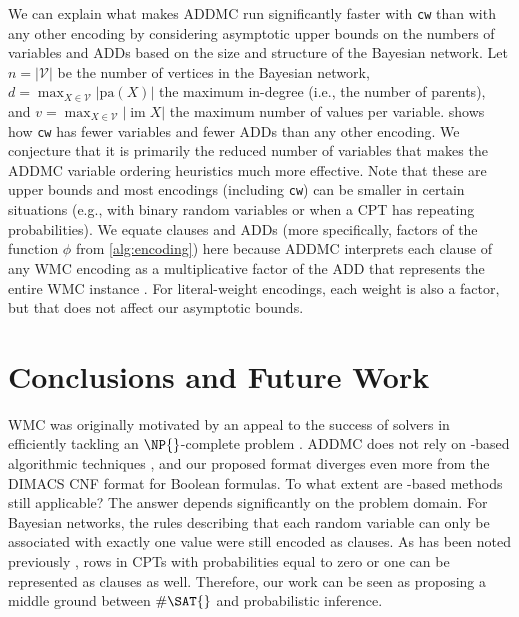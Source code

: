 \documentclass[accepted]{uai2021}
\theoremstyle{definition}
\DeclareMathOperator{\im}{im}
\begin{document}
We can explain what makes \textsf{ADDMC} \citep{DBLP:conf/aaai/DudekPV20} run
significantly faster with \texttt{cw} than with any other encoding by
considering asymptotic upper bounds on the numbers of variables and ADDs based
on the size and structure of the Bayesian network. Let $n = |\mathcal{V}|$ be
the number of vertices in the Bayesian network, $d = \max_{X \in \mathcal{V}}
|\mathrm{pa}(X)|$ the maximum in-degree (i.e., the number of parents), and $v =
\max_{X \in \mathcal{V}} |\im X|$ the maximum number of values per variable.
 shows how \texttt{cw} has fewer variables and fewer ADDs
than any other encoding. We conjecture that it is primarily the reduced number
of variables that makes the \textsf{ADDMC} variable ordering heuristics much
more effective. Note that these are upper bounds and most encodings (including
\texttt{cw}) can be smaller in certain situations (e.g., with binary random
variables or when a CPT has repeating probabilities). We equate clauses and ADDs
(more specifically, factors of the function $\phi$ from \cref{alg:encoding})
here because \textsf{ADDMC} interprets each clause of any WMC encoding as a
multiplicative factor of the ADD that represents the entire WMC instance
\citep{DBLP:conf/aaai/DudekPV20}. For literal-weight encodings, each weight is
also a factor, but that does not affect our asymptotic bounds.

\section{Conclusions and Future Work}

WMC was originally motivated by an appeal to the success of \SAT{} solvers in
efficiently tackling an $\NP{}$-complete problem
\citep{DBLP:conf/aaai/SangBK05}. \textsf{ADDMC} does not rely on \SAT{}-based
algorithmic techniques \citep{DBLP:conf/aaai/DudekPV20}, and our proposed format
diverges even more from the DIMACS CNF format for Boolean formulas. To what
extent are \SAT{}-based methods still applicable? The answer depends
significantly on the problem domain. For Bayesian networks, the rules describing
that each random variable can only be associated with exactly one value were
still encoded as clauses. As has been noted previously
\citep{DBLP:conf/sat/ChaviraD06}, rows in CPTs with probabilities equal to zero
or one can be represented as clauses as well. Therefore, our work can be seen as
proposing a middle ground between $\#\SAT{}$ and probabilistic inference.
\end{document}
